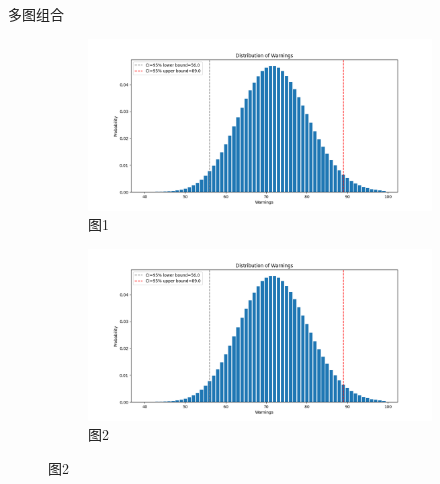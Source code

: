 \documentclass{cls/simplereport}
\begin{document}
\noindent
多图组合
\begin{figure}[h]
	\centering
	\begin{subfigure}{0.4\textwidth}
		\centering
		\includegraphics[width=\textwidth]{example-report-gfx/eg_dist}
		\caption{图1}
		\label{fig:image1}
	\end{subfigure}
	\quad 
	\begin{subfigure}{0.4\textwidth}
		\centering
		\includegraphics[width=\textwidth]{example-report-gfx/eg_dist}
		\caption{图2}
		\label{fig:image2}
	\end{subfigure}
	
	\vspace{6pt}
	

\end{figure}
\end{document}
